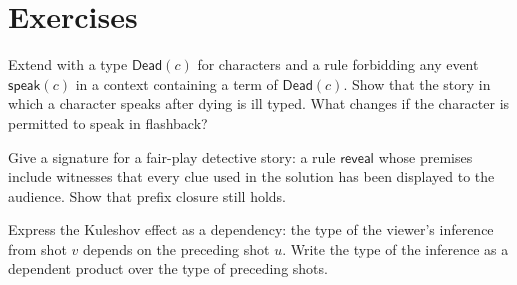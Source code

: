 \section*{Exercises}

\begin{exercise}
Extend  with a type $\mathsf{Dead}(c)$ for characters and a rule forbidding any event $\mathsf{speak}(c)$ in a context containing a term of $\mathsf{Dead}(c)$. Show that the story in which a character speaks after dying is ill typed. What changes if the character is permitted to speak in flashback?
\end{exercise}

\begin{exercise}
Give a signature for a fair-play detective story: a rule $\mathsf{reveal}$ whose premises include witnesses that every clue used in the solution has been displayed to the audience. Show that prefix closure still holds.
\end{exercise}

\begin{exercise}
Express the Kuleshov effect as a dependency: the type of the viewer's inference from shot $v$ depends on the preceding shot $u$. Write the type of the inference as a dependent product over the type of preceding shots.
\end{exercise}
